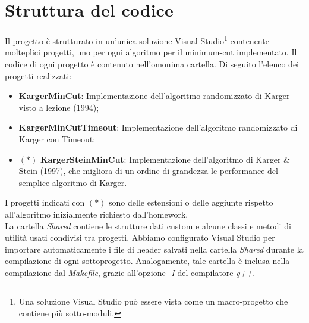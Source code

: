 \section{Struttura del codice}
\label{cap:code-structure}

Il progetto è strutturato in un'unica soluzione Visual Studio\footnote{Una soluzione Visual Studio può essere vista come un macro-progetto che contiene più sotto-moduli.} contenente molteplici progetti, uno per ogni algoritmo per il minimum-cut implementato. Il codice di ogni progetto è contenuto nell'omonima cartella. Di seguito l'elenco dei progetti realizzati:

\begin{itemize}
    \item \textbf{KargerMinCut}: Implementazione dell'algoritmo randomizzato di Karger visto a lezione (1994);
    \item \textbf{KargerMinCutTimeout}: Implementazione dell'algoritmo randomizzato di Karger con Timeout;
    \item  $(*)$ \textbf{KargerSteinMinCut}: Implementazione dell'algoritmo di Karger \& Stein (1997), che migliora di un ordine di grandezza le performance del semplice algoritmo di Karger.
\end{itemize}

\noindent I progetti indicati con $(*)$ sono delle estensioni o delle aggiunte rispetto all'algoritmo inizialmente richiesto dall'homework.
\\

\noindent La cartella \textit{Shared} contiene le strutture dati custom e alcune classi e metodi di utilità usati
condivisi tra progetti. Abbiamo configurato Visual Studio per importare automaticamente i file di header salvati nella cartella \textit{Shared}
durante la compilazione di ogni sottoprogetto. Analogamente, tale cartella è inclusa nella compilazione dal \textit{Makefile}, grazie all'opzione \textit{-I} del compilatore \textit{g++}.

